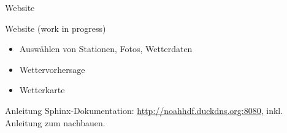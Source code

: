 \begin{frame}[t]{Website}
  \begin{block}{Website \tiny\alert{(work in progress)}}
    \begin{itemize}
      \item Auswählen von Stationen, Fotos, Wetterdaten
      \item Wettervorhersage
      \item Wetterkarte
    \end{itemize}


  \end{block}
  \begin{block}{Anleitung}
    Sphinx-Dokumentation:
    \url{http://noahhdf.duckdns.org:8080},
    inkl. Anleitung zum nachbauen.
  \end{block}
\end{frame}

